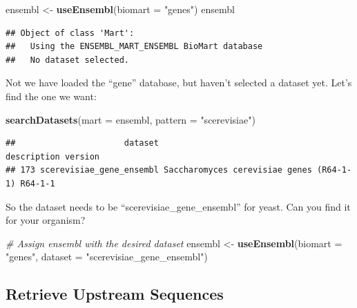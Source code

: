 \documentclass[
]{book}
\newenvironment{Shaded}{\begin{snugshade}}{\end{snugshade}}
\newcommand{\AttributeTok}[1]{\textcolor[rgb]{0.13,0.29,0.53}{#1}}
\newcommand{\CommentTok}[1]{\textcolor[rgb]{0.56,0.35,0.01}{\textit{#1}}}
\newcommand{\FunctionTok}[1]{\textcolor[rgb]{0.13,0.29,0.53}{\textbf{#1}}}
\newcommand{\NormalTok}[1]{#1}
\newcommand{\OtherTok}[1]{\textcolor[rgb]{0.56,0.35,0.01}{#1}}
\newcommand{\StringTok}[1]{\textcolor[rgb]{0.31,0.60,0.02}{#1}}
\begin{document}
\begin{Shaded}
\begin{Highlighting}[]
\NormalTok{ensembl }\OtherTok{\textless{}{-}} \FunctionTok{useEnsembl}\NormalTok{(}\AttributeTok{biomart =} \StringTok{"genes"}\NormalTok{)}
\NormalTok{ensembl}
\end{Highlighting}
\end{Shaded}

\begin{verbatim}
## Object of class 'Mart':
##   Using the ENSEMBL_MART_ENSEMBL BioMart database
##   No dataset selected.
\end{verbatim}

Not we have loaded the ``gene'' database, but haven't selected a dataset
yet. Let's find the one we want:

\begin{Shaded}
\begin{Highlighting}[]
\FunctionTok{searchDatasets}\NormalTok{(}\AttributeTok{mart =}\NormalTok{ ensembl, }
               \AttributeTok{pattern =} \StringTok{"scerevisiae"}\NormalTok{)}
\end{Highlighting}
\end{Shaded}

\begin{verbatim}
##                      dataset                              description version
## 173 scerevisiae_gene_ensembl Saccharomyces cerevisiae genes (R64-1-1) R64-1-1
\end{verbatim}

So the dataset needs to be ``scerevisiae\_gene\_ensembl'' for yeast. Can you
find it for your organism?

\begin{Shaded}
\begin{Highlighting}[]
\CommentTok{\# Assign ensembl with the desired dataset}
\NormalTok{ensembl }\OtherTok{\textless{}{-}} \FunctionTok{useEnsembl}\NormalTok{(}\AttributeTok{biomart =} \StringTok{"genes"}\NormalTok{, }
                      \AttributeTok{dataset =} \StringTok{"scerevisiae\_gene\_ensembl"}\NormalTok{)}
\end{Highlighting}
\end{Shaded}

\hypertarget{retrieve-upstream-sequences}{%
\subsection{Retrieve Upstream Sequences}\label{retrieve-upstream-sequences}}
\end{document}
